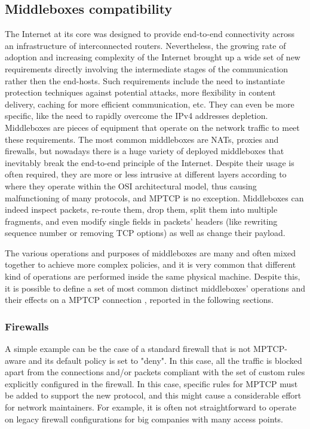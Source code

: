 \subsection{Middleboxes compatibility}
The Internet at its core was designed to provide end-to-end connectivity across an infrastructure of interconnected routers. Nevertheless, the growing rate of adoption and increasing complexity of the Internet brought up a wide set of new requirements directly involving the intermediate stages of the communication rather then the end-hosts. Such requirements include the need to instantiate protection techniques against potential attacks, more flexibility in content delivery, caching for more efficient communication, etc. They can even be more specific, like the need to rapidly overcome the IPv4 addresses depletion. Middleboxes are pieces of equipment that operate on the network traffic to meet these requirements. The most common middleboxes are NATs, proxies and firewalls, but nowadays there is a huge variety of deployed middleboxes that inevitably break the end-to-end principle of the Internet. Despite their usage is often required, they are more or less intrusive at different layers according to where they operate within the OSI architectural model, thus causing malfunctioning of many protocols, and MPTCP is no exception. Middleboxes can indeed inspect packets, re-route them, drop them, split them into multiple fragments, and even modify single fields in packets' headers (like rewriting sequence number or removing TCP options) as well as change their payload.

The various operations and purposes of middleboxes are many and often mixed together to achieve more complex policies, and it is very common that different kind of operations are performed inside the same physical machine. Despite this, it is possible to define a set of most common distinct middleboxes' operations and their effects on a MPTCP connection  \cite{HDPDB13} \cite{RPBFHDBH12} \cite{2014:2578508}, reported in the following sections.

\subsubsection{Firewalls}
A simple example can be the case of a standard firewall that is not MPTCP-aware and its default policy is set to "deny". In this case, all the traffic is blocked apart from the connections and/or packets compliant with the set of custom rules explicitly configured in the firewall. In this case, specific rules for MPTCP must be added to support the new protocol, and this might cause a considerable effort for network maintainers. For example, it is often not straightforward to operate on legacy firewall configurations for big companies with many access points.

